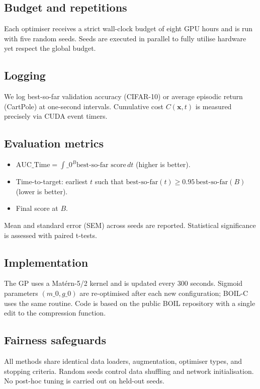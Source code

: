\documentclass{article} %
\begin{document}
\subsection{Budget and repetitions}
Each optimiser receives a strict wall-clock budget of eight GPU hours and is run with five random seeds. Seeds are executed in parallel to fully utilise hardware yet respect the global budget.

\subsection{Logging}
We log best-so-far validation accuracy (CIFAR-10) or average episodic return (CartPole) at one-second intervals. Cumulative cost \(C(\mathbf{x}, t)\) is measured precisely via CUDA event timers.

\subsection{Evaluation metrics}
\begin{itemize}
  \item \(\mathrm{AUC\_Time} = \int\_{0}^{B} \text{best-so-far score}\, dt\) (higher is better).
  \item Time-to-target: earliest \(t\) such that \(\text{best-so-far}(t) \ge 0.95\,\text{best-so-far}(B)\) (lower is better).
  \item Final score at \(B\).
\end{itemize}
Mean and standard error (SEM) across seeds are reported. Statistical significance is assessed with paired t-tests.

\subsection{Implementation}
The GP uses a Mat\'ern-5/2 kernel and is updated every 300 seconds. Sigmoid parameters \((m\_0, g\_0)\) are re-optimised after each new configuration; BOIL-C uses the same routine. Code is based on the public BOIL repository with a single edit to the compression function.

\subsection{Fairness safeguards}
All methods share identical data loaders, augmentation, optimiser types, and stopping criteria. Random seeds control data shuffling and network initialisation. No post-hoc tuning is carried out on held-out seeds.
\end{document}
